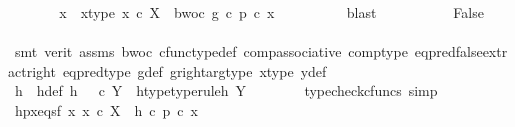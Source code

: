 \begin{isabellebody}
\ \ \ \ \isamarkupfalse%
\ \isamarkupfalse%
\ x\ \ x{\isacharunderscore}{\kern0pt}type{\isacharcolon}{\kern0pt}\ {\isachardoublequoteopen}x\ {\isasymin}\isactrlsub c\ X{\isachardoublequoteclose}\ \ bwoc{\isacharcolon}{\kern0pt}\ {\isachardoublequoteopen}g\ {\isasymcirc}\isactrlsub c\ p\ {\isasymcirc}\isactrlsub c\ x\ {\isasymnoteq}\ {\isasymf}{\isachardoublequoteclose}\isanewline
\ \ \ \ \ \ \isamarkupfalse%
\ blast\isanewline
\ \ \ \ \isanewline
\ \ \ \ \isamarkupfalse%
\ False\isanewline
\ \ \ \ \ \ \isamarkupfalse%
\ {\isacharparenleft}{\kern0pt}smt\ {\isacharparenleft}{\kern0pt}verit{\isacharparenright}{\kern0pt}\ assms{\isacharparenleft}{\kern0pt}{}{\isacharparenright}{\kern0pt}\ bwoc\ cfunc{\isacharunderscore}{\kern0pt}type{\isacharunderscore}{\kern0pt}def\ comp{\isacharunderscore}{\kern0pt}associative\ comp{\isacharunderscore}{\kern0pt}type\ eq{\isacharunderscore}{\kern0pt}pred{\isacharunderscore}{\kern0pt}false{\isacharunderscore}{\kern0pt}extract{\isacharunderscore}{\kern0pt}right\ eq{\isacharunderscore}{\kern0pt}pred{\isacharunderscore}{\kern0pt}type\ g{\isacharunderscore}{\kern0pt}def\ g{\isacharunderscore}{\kern0pt}right{\isacharunderscore}{\kern0pt}arg{\isacharunderscore}{\kern0pt}type\ x{\isacharunderscore}{\kern0pt}type\ y{\isacharunderscore}{\kern0pt}def{\isacharparenright}{\kern0pt}\isanewline
\ \ \isamarkupfalse%
\isanewline
\ \ \isamarkupfalse%
\ h\ \ h{\isacharunderscore}{\kern0pt}def{\isacharcolon}{\kern0pt}\ {\isachardoublequoteopen}h\ {\isacharequal}{\kern0pt}\ {\isasymf}\ {\isasymcirc}\isactrlsub c\ {\isasymbeta}\isactrlbsub Y\isactrlesub {\isachardoublequoteclose}\ \ h{\isacharunderscore}{\kern0pt}type{\isacharbrackleft}{\kern0pt}type{\isacharunderscore}{\kern0pt}rule{\isacharbrackright}{\kern0pt}{\isacharcolon}{\kern0pt}{\isachardoublequoteopen}h{\isacharcolon}{\kern0pt}\ Y\ {\isasymrightarrow}\ {\isasymOmega}{\isachardoublequoteclose}\isanewline
\ \ \ \ \isamarkupfalse%
\ {\isacharparenleft}{\kern0pt}typecheck{\isacharunderscore}{\kern0pt}cfuncs{\isacharcomma}{\kern0pt}\ simp{\isacharparenright}{\kern0pt}\isanewline
\ \ \isamarkupfalse%
\ hpx{\isacharunderscore}{\kern0pt}eqs{\isacharunderscore}{\kern0pt}f{\isacharcolon}{\kern0pt}\ {\isachardoublequoteopen}{\isasymforall}x{\isachardot}{\kern0pt}\ x\ {\isasymin}\isactrlsub c\ X\ {\isasymlongrightarrow}\ h\ {\isasymcirc}\isactrlsub c\ p\ {\isasymcirc}\isactrlsub c\ x\ {\isacharequal}{\kern0pt}\ {\isasymf}{\isachardoublequoteclose}\isanewline

\end{isabellebody}
